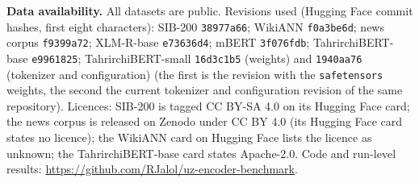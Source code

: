 \documentclass[11pt]{book}
\begin{document}
\textbf{Data availability.} All datasets are public. Revisions used (Hugging Face commit hashes, first eight characters): SIB-200 \texttt{38977a66}; WikiANN \texttt{f0a3be6d}; news corpus \texttt{f9399a72}; XLM-R-base \texttt{e73636d4}; mBERT \texttt{3f076fdb}; TahrirchiBERT-base \texttt{e9961825}; TahrirchiBERT-small \texttt{16d3c1b5} (weights) and \texttt{1940aa76} (tokenizer and configuration) (the first is the revision with the \texttt{safetensors} weights, the second the current tokenizer and configuration revision of the same repository). Licences: SIB-200 is tagged CC BY-SA 4.0 on its Hugging Face card; the news corpus is released on Zenodo under CC BY 4.0 (its Hugging Face card states no licence); the WikiANN card on Hugging Face lists the licence as unknown; the TahrirchiBERT-base card states Apache-2.0. Code and run-level results: \url{https://github.com/RJalol/uz-encoder-benchmark}.
\end{document}
